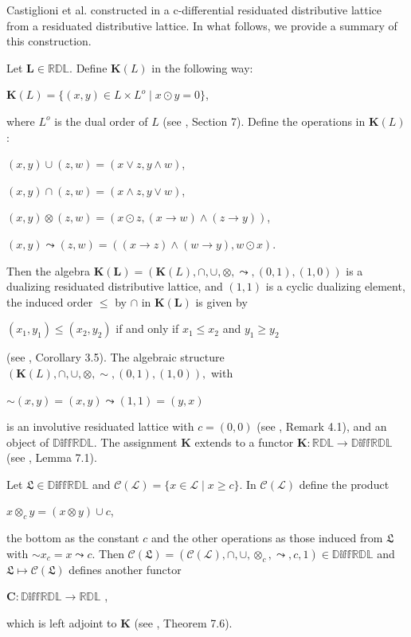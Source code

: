 \documentclass[final,12pt,times]{elsarticle}
\theoremstyle{plain}
\theoremstyle{definition}
\theoremstyle{break}
\begin{document}
Castiglioni et al. constructed in \cite{Castiglionib} a c-differential residuated distributive lattice from a residuated distributive lattice. In what follows, we provide a summary of this construction.\medskip

Let $\mathbf{L}\in \mathbb{RDL}$. Define $\mathbf{K}(L)$ in the following way:
\begin{center} $\mathbf{K}(L)=\{(x,y)\in L\times L^o \mid x\odot y=0\}$,
\end{center}
where $L^o$ is the dual order of $L$ (see \cite{Castiglionib}, Section 7). Define the operations in $\mathbf{K}(L)$:
\begin{center} $(x,y)\cup (z,w)=(x\vee z,y\wedge w)$,

$(x,y)\cap (z,w)=(x\wedge z,y\vee w)$,

$(x,y)\otimes(z,w)=(x\odot z,(x\rightarrow w)\wedge (z\rightarrow y))$,

$(x,y)\leadsto(z,w)=((x\rightarrow z)\wedge (w \rightarrow y), w\odot x)$.

\end{center}
Then the algebra $\mathbf{K(L)}=(\mathbf{K}(L),\cap,\cup,\otimes,\leadsto,(0,1),(1,0))$ is a dualizing residuated distributive lattice, and $(1,1)$ is a cyclic dualizing element, the induced order $\leq$ by $\cap$ in $\mathbf{K(L)}$ is given by
 \begin{center} $(x_1,y_1)\leq (x_2,y_2)$ if and only if $x_1\leq x_2$ and $y_1\geq y_2$
 \end{center}
 (see \cite{Tsinakis}, Corollary 3.5). The algebraic structure $(\mathbf{K}(L),\cap,\cup,\otimes,{\sim},(0,1),(1,0)),$ with 
\begin{center} ${\sim}(x,y)=(x,y)\leadsto (1,1)=(y,x)$
 \end{center}
is an involutive residuated lattice with $c=(0,0)$ (see  \cite{Castiglionib}, Remark 4.1), and an object of $\mathbb{D\text{iff}RDL}$. The assignment $\mathbf{K}$ extends to a functor $\mathbf{K}:\mathbb{RDL}\rightarrow \mathbb{D\text{iff}RDL}$ (see \cite{Castiglionib}, Lemma 7.1).

\medskip

Let $\boldsymbol{\mathfrak{L}}\in \mathbb{D\text{iff}RDL}$ and $\mathcal{C}(\mathcal{L})=\{x\in \mathcal{L}\mid x\geq c\}$. In  $\mathcal{C}(\mathcal{L})$ define the product
\begin{center} $x\otimes_cy=(x\otimes y)\cup c$,
\end{center}
the bottom as the constant $c$ and the other operations as those induced from $\boldsymbol{\mathfrak{L}}$ with ${\sim}x_c=x\leadsto c$. Then $\mathcal{C}(\boldsymbol{\mathfrak{L}})=(\mathcal{C}(\mathcal{L}),\cap,\cup,\otimes_c,\leadsto,c,1)\in\mathbb{D\text{iff}RDL}$ and $\boldsymbol{\mathfrak{L}}\mapsto \mathcal{C}(\boldsymbol{\mathfrak{L}})$ defines another functor
\begin{center} $\mathbf{C}:\mathbb{D\text{iff}RDL}\rightarrow\mathbb{RDL}$ ,
\end{center}
which is left adjoint to $\mathbf{K}$ (see \cite{Castiglionib}, Theorem 7.6).
\end{document}
